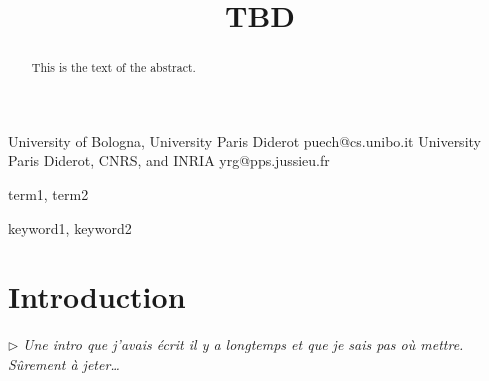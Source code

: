 \documentclass[preprint]{sigplanconf}
\newcommand{\remtext}[1]{\textcolor{bwgreen}{$\triangleright$ \textsl{#1}}}
\begin{document}
\copyrightdata{[to be supplied]} 


\title{TBD}

           {University of Bologna, University Paris Diderot}
           {puech@cs.unibo.it}
           {University Paris Diderot, CNRS, and INRIA}
           {yrg@pps.jussieu.fr}

\maketitle

\begin{abstract}
This is the text of the abstract.
\end{abstract}


\terms
term1, term2

\keywords
keyword1, keyword2

\section{Introduction}

\remtext{Une intro que j'avais écrit il y a longtemps et que je sais
  pas où mettre. Sûrement à jeter\ldots}
\end{document}
